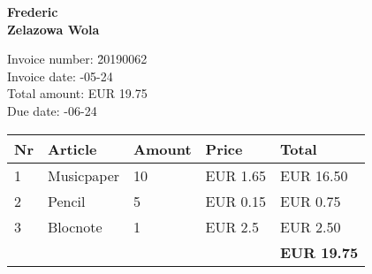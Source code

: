 \documentclass[a4paper]{article}
\begin{document}
\noindent\textbf{Frederic\\Zelazowa Wola}

\vspace{8mm}



\begin{tabbing}
Invoice number: \= 20190062 \\
Invoice date:   -05-24 \\
Total amount:   \> EUR 19.75 \\
Due date:       -06-24 \\
\end{tabbing}

\begin{tabular}{lp{30mm}ll|l}\\ \hline
{\bfseries Nr} &
{\bfseries Article} &
{\bfseries Amount} &
{\bfseries Price} &
{\bfseries Total} \\ \hline\hline
1 &Musicpaper &10 &EUR 1.65 &EUR 16.50 \\2 &Pencil &5 &EUR 0.15 &EUR 0.75 \\3 &Blocnote &1 &EUR 2.5 &EUR 2.50\\\hline
 & & & & \textbf{EUR 19.75} \\
\end{tabular}
\end{document}
